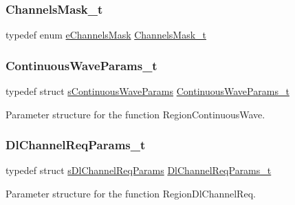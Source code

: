 \subsubsection{\texorpdfstring{Channels\+Mask\+\_\+t}{ChannelsMask\_t}}
{\footnotesize\ttfamily typedef enum \hyperlink{group__REGION_ga7a62e669f567fc160ad58210664bca9c}{e\+Channels\+Mask} \hyperlink{group__REGION_ga933f695eea70935418e2175940b92311}{Channels\+Mask\+\_\+t}}

\mbox{\label{group__REGION_gaf39bb5ba06921139c6d17f88a8d518cd}} 
\subsubsection{\texorpdfstring{Continuous\+Wave\+Params\+\_\+t}{ContinuousWaveParams\_t}}
{\footnotesize\ttfamily typedef struct \hyperlink{structsContinuousWaveParams}{s\+Continuous\+Wave\+Params} \hyperlink{group__REGION_gaf39bb5ba06921139c6d17f88a8d518cd}{Continuous\+Wave\+Params\+\_\+t}}

Parameter structure for the function Region\+Continuous\+Wave. \mbox{\label{group__REGION_gae0d608ff1f8ea0a430e4f9a4c38ec7f3}} 
\subsubsection{\texorpdfstring{Dl\+Channel\+Req\+Params\+\_\+t}{DlChannelReqParams\_t}}
{\footnotesize\ttfamily typedef struct \hyperlink{structsDlChannelReqParams}{s\+Dl\+Channel\+Req\+Params} \hyperlink{group__REGION_gae0d608ff1f8ea0a430e4f9a4c38ec7f3}{Dl\+Channel\+Req\+Params\+\_\+t}}

Parameter structure for the function Region\+Dl\+Channel\+Req. \mbox{\label{group__REGION_gab471483fff904f4f89bbc03f7fc380ab}} 
